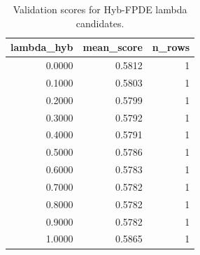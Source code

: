 \begin{table}[t]
\caption{Validation scores for Hyb-FPDE lambda candidates.}
\label{tab:lambda_distribution_computed}
\centering
\begin{tabular}{rrr}
\toprule
lambda\_hyb & mean\_score & n\_rows \\
\midrule
0.0000 & 0.5812 & 1 \\
0.1000 & 0.5803 & 1 \\
0.2000 & 0.5799 & 1 \\
0.3000 & 0.5792 & 1 \\
0.4000 & 0.5791 & 1 \\
0.5000 & 0.5786 & 1 \\
0.6000 & 0.5783 & 1 \\
0.7000 & 0.5782 & 1 \\
0.8000 & 0.5782 & 1 \\
0.9000 & 0.5782 & 1 \\
1.0000 & 0.5865 & 1 \\
\bottomrule
\end{tabular}

\end{table}
